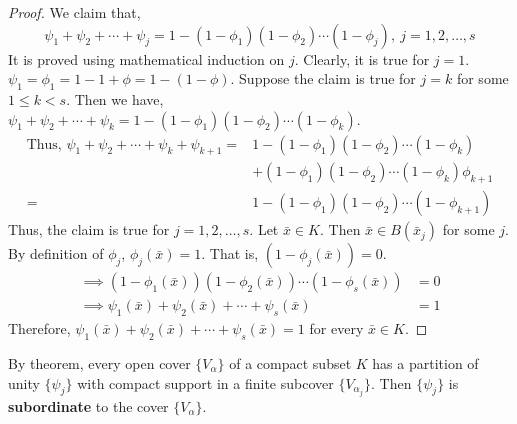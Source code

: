 \begin{proof}
	We claim that,
	\begin{equation}
		\psi_1+\psi_2 + \dotsb+\psi_j = 1 - (1-\phi_1)(1-\phi_2) \dotsm (1-\phi_j),\ j = 1,2,\dots,s
	\end{equation}
	It is proved using mathematical induction on $j$.
	Clearly, it is true for $j = 1$.
	$\psi_1 = \phi_1 = 1 - 1 + \phi = 1 - (1-\phi)$.
	Suppose the claim is true for $j = k$ for some $1 \le k < s$.
	Then we have, $\psi_1 + \psi_2 + \dotsb + \psi_k = 1-(1-\phi_1)(1-\phi_2) \dotsm (1-\phi_k)$.
	\begin{align*}
		\text{Thus, }\psi_1 + \psi_2 + \dotsb + \psi_k + \psi_{k+1} = & 1-(1-\phi_1)(1-\phi_2) \dotsm (1-\phi_k) \\
		& + (1-\phi_1)(1-\phi_2) \dotsm (1-\phi_k)\phi_{k+1}\\
		= & 1-(1-\phi_1)(1-\phi_2) \dotsm (1-\phi_{k+1})
	\end{align*}
	Thus, the claim is true for $j = 1,2,\dots,s$.
	Let $\bar{x} \in K$.
	Then $\bar{x} \in B(\bar{x}_j)$ for some $j$.
	By definition of $\phi_j$, $\phi_j(\bar{x}) = 1$.
	That is, $(1-\phi_j(\bar{x})) = 0$.
	\begin{align*}
		\implies (1-\phi_1(\bar{x}))(1-\phi_2(\bar{x})) \dotsm (1-\phi_s(\bar{x})) & = 0 \\
		\implies \psi_1(\bar{x}) + \psi_2(\bar{x}) + \dotsb + \psi_s(\bar{x}) & = 1
	\end{align*}
	Therefore, $\psi_1(\bar{x}) + \psi_2(\bar{x}) + \dotsb + \psi_s(\bar{x}) = 1$ for every $\bar{x} \in K$.
\end{proof}

\begin{definition}
	By theorem, every open cover $\{V_\alpha\}$ of a compact subset $K$ has a partition of unity $\{ \psi_j \}$ with compact support in a finite subcover $\{V_{\alpha_j}\}$.
	Then $\{ \psi_j \}$ is \textbf{subordinate} to the cover $\{V_\alpha\}$.
\end{definition}

